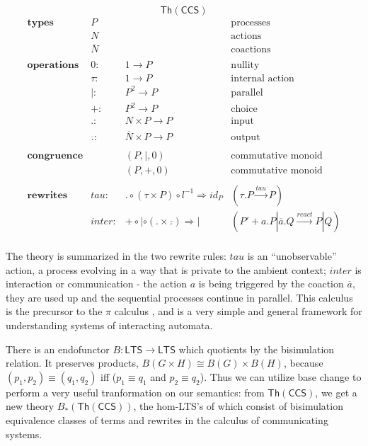 \documentclass{amsart}
\theoremstyle{definition}
\newcommand{\Th}{\mathsf{Th}}
\newcommand{\maps}{\colon}
\begin{document}
\[\Th(\mathsf{CCS})\]
\[\begin{array}{lrll}
    \textbf{types} & P && \text{processes}\\
                   & N && \text{actions}\\
                   & \overline{N} && \text{coactions}\\\\
    \textbf{operations} & 0\maps & 1\to P & \text{nullity}\\
                   & \tau\maps & 1\to P & \text{internal action}\\
                   & |\maps & P^2\to P & \text{parallel}\\
                   & +\maps & P^2\to P &\text{choice}\\
                   & .\maps & N\times P\to P & \text{input}\\
                   & \overline{.}\maps & \overline{N}\times P\to P & \text{output}\\\\
    \textbf{congruence} && (P,|,0) & \text{commutative monoid}\\
                   && (P,+,0) & \text{commutative monoid}\\\\
    \textbf{rewrites} & tau\maps & .\circ (\tau\times P)\circ l^{-1} \Rightarrow id_P & (\tau.P \xrightarrow{tau} P)\\
                   & inter \maps & +\circ |\circ (.\times \overline{.}) \Rightarrow | & (P'+a.P|\overline{a}.Q \xrightarrow{react} P|Q)\\
  \end{array}\]

The theory is summarized in the two rewrite rules: $tau$ is an ``unobservable'' action, a process evolving in a way that is private to the ambient context; $inter$ is interaction or communication - the action $a$ is being triggered by the coaction $\overline{a}$, they are used up and the sequential processes continue in parallel. This calculus is the precursor to the $\pi$ calculus \cite{milner}, and is a very simple and general framework for understanding systems of interacting automata.

There is an endofunctor $B\maps \mathsf{LTS} \to \mathsf{LTS}$ which quotients by the bisimulation relation. It preserves products, $B(G\times H)\cong B(G)\times B(H)$, because $(p_1,p_2)\equiv(q_1,q_2)$ iff ($p_1\equiv q_1$ and $p_2\equiv q_2$). Thus we can utilize base change to perform a very useful tranformation  on our semantics: from $\Th(\mathsf{CCS})$, we get a new theory $B_*(\Th(\mathsf{CCS}))$, the hom-LTS's of which consist of bisimulation equivalence classes of terms and rewrites in the calculus of communicating systems.
\end{document}
